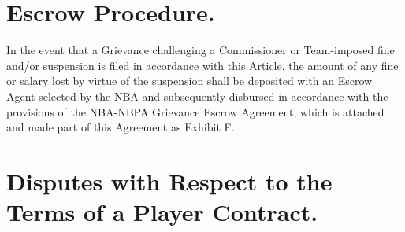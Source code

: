 \documentclass[
]{book}
\begin{document}
\hypertarget{escrow-procedure.}{%
\section{Escrow Procedure.}\label{escrow-procedure.}}

In the event that a Grievance challenging a Commissioner or Team-imposed fine and/or suspension is filed in accordance with this Article, the amount of any fine or salary lost by virtue of the suspension shall be deposited with an Escrow Agent selected by the NBA and subsequently disbursed in accordance with the provisions of the NBA-NBPA Grievance Escrow Agreement, which is attached and made part of this Agreement as Exhibit F.

\hypertarget{disputes-with-respect-to-the-terms-of-a-player-contract.}{%
\section{Disputes with Respect to the Terms of a Player Contract.}\label{disputes-with-respect-to-the-terms-of-a-player-contract.}}
\end{document}
